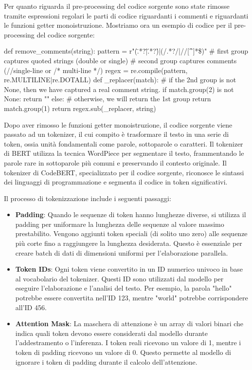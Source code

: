 \documentclass[../../Thesis.tex]{subfiles}
\begin{document}
Per quanto riguarda il pre-processing del codice sorgente sono state rimosse tramite espressioni regolari le parti di codice riguardanti i commenti e riguardanti le funzioni getter monoistruzione. Mostriamo ora un esempio di codice per il pre-processing del codice sorgente:
\begin{python}
    def remove_comments(string):
    pattern = r"(\".*?\"|\'.*?\')|(/\*.*?\*/|//[^\r\n]*\$)"
    # first group captures quoted strings (double or single)
    # second group captures comments (//single-line or /* multi-line */)
    regex = re.compile(pattern, re.MULTILINE|re.DOTALL)
    def _replacer(match):
        # if the 2nd group is not None, then we have captured a real comment string.
        if match.group(2) is not None:
            return ""
        else: # otherwise, we will return the 1st group
            return match.group(1)
    return regex.sub(_replacer, string)
\end{python}
Dopo aver rimosso le funzioni getter monoistruzione, il codice sorgente viene passato ad un tokenizer, il cui compito è trasformare il testo in una serie di token, ossia unità fondamentali come parole, sottoparole o caratteri. Il tokenizer di BERT utilizza la tecnica WordPiece per segmentare il testo, frammentando le parole rare in sottoparole più comuni e preservando il contesto originale. Il tokenizer di CodeBERT, specializzato per il codice sorgente, riconosce le sintassi dei linguaggi di programmazione e segmenta il codice in token significativi.

Il processo di tokenizzazione include i seguenti passaggi:

\begin{itemize}
    \item \textbf{Padding}: Quando le sequenze di token hanno lunghezze diverse, si utilizza il padding per uniformare la lunghezza delle sequenze al valore massimo prestabilito. Vengono aggiunti token speciali (di solito uno zero) alle sequenze più corte fino a raggiungere la lunghezza desiderata. Questo è essenziale per creare batch di dati di dimensioni uniformi per l'elaborazione parallela.
    
    \item \textbf{Token IDs}: Ogni token viene convertito in un ID numerico univoco in base al vocabolario del tokenizer. Questi ID sono utilizzati dal modello per eseguire l'elaborazione e l'analisi del testo. Per esempio, la parola "hello" potrebbe essere convertita nell'ID 123, mentre "world" potrebbe corrispondere all'ID 456.
    
    \item \textbf{Attention Mask}: La maschera di attenzione è un array di valori binari che indica quali token devono essere considerati dal modello durante l'addestramento o l'inferenza. I token reali ricevono un valore di 1, mentre i token di padding ricevono un valore di 0. Questo permette al modello di ignorare i token di padding durante il calcolo dell'attenzione.
\end{itemize}
\end{document}
